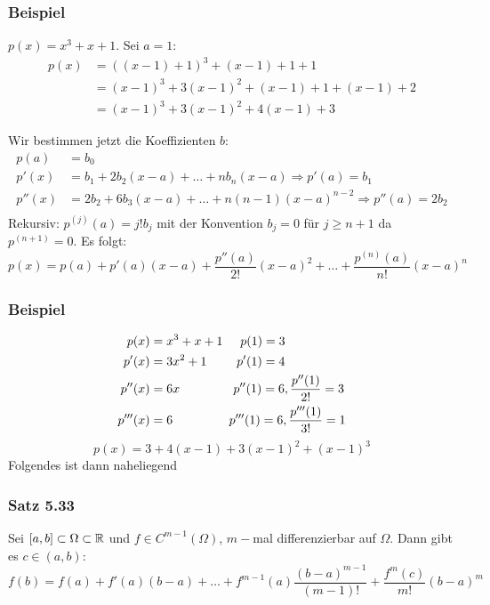 \subsubsection*{Beispiel}
$p(x)=x^3+x+1$. Sei $a=1$:
\begin{align*}
p(x)&=\left( \left( x-1\right)+1\right)^3 +\left( x-1\right)+1+1\\
&=\left( x-1\right)^3+3\left( x-1\right)^2+\left( x-1\right)+1+\left( x-1\right)+2\\
&=\left( x-1\right)^3+3\left( x-1\right)^2+4\left( x-1\right)+3
\end{align*}

Wir bestimmen jetzt die Koeffizienten $b$:
\begin{align*}
p(a)&=b_0\\
p'(x)&=b_1+2b_2(x-a)+\dots+nb_n(x-a)\Rightarrow p'(a)=b_1\\
p''(x)&=2b_2+6b_3(x-a)+\dots+n(n-1)(x-a)^{n-2}\Rightarrow p''(a)=2b_2\\
\end{align*}
Rekursiv: $p^{(j)}(a)=j!b_j$ mit der Konvention $b_j=0$ für $j\geq n+1$ da $p^{(n+1)}=0$. Es folgt:
\[p(x)=p(a)+p'(a)(x-a)+\frac{p''(a)}{2!}(x-a)^2+\dots+\frac{p^{(n)}(a)}{n!}\left( x-a\right)^n\]

\subsubsection*{Beispiel}
\begin{align*}
p(x)&=x^3+x+1 \hspace{5mm}p(1)=3\\
p'(x)&=3x^2+1\hspace{8.5mm} p'(1)=4\\
p''(x)&=6x \hspace{15.2mm} p''(1)=6, \frac{p''(1)}{2!}=3\\
p'''(x)&=6 \hspace{16mm} p'''(1)=6, \frac{p'''(1)}{3!}=1\\
\end{align*}
\[p(x)=3+4(x-1)+3(x-1)^2+(x-1)^3\]
Folgendes ist dann naheliegend

\subsubsection*{Satz 5.33}
Sei $\lbrack a,b\rbrack\subset \Omega\subset\mathbb{R}$ und $f\in C^{m-1}\left( \Omega\right)$, $m-$mal differenzierbar auf $\Omega$. Dann gibt es $c\in(a,b)$:
\[f(b)=f(a)+f'(a)(b-a)+\dots+f^{m-1}(a)\frac{(b-a)^{m-1}}{(m-1)!}+\frac{f^m(c)}{m!}(b-a)^m\]

